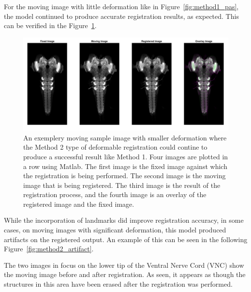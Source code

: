\documentclass{report}
\begin{document}
	For the moving image with little deformation like in Figure~\ref{fig:method1_pas}, the model continued to produce accurate registration results, as expected. This can be verified in the Figure~\ref{fig:method2_pas}.
	
	\begin{figure}[H]
		\centering
		\includegraphics[width=0.9\columnwidth]{resources/chapter4/method2/np_brain7_scaled.tif.png}
		\caption{An exemplery moving sample image with smaller deformation where the Method 2 type of deformable registration could contine to produce a successful result like Method 1. Four images are plotted in a row using Matlab. The first image is the fixed image against which the registration is being performed. The second image is the moving image that is being registered. The third image is the result of the registration process, and the fourth image is an overlay of the registered image and the fixed image.}
		\label{fig:method2_pas}
	\end{figure}
	
	While the incorporation of landmarks did improve registration accuracy, in some cases, on moving images with significant deformation, this model produced artifacts on the registered output. An example of this can be seen in the following Figure~\ref{fig:method2_artifact}.
	
	The two images in focus on the lower tip of the Ventral Nerve Cord (VNC) show the moving image before and after registration. As seen, it appears as though the structures in this area have been erased after the registration was performed.
	
\end{document}
